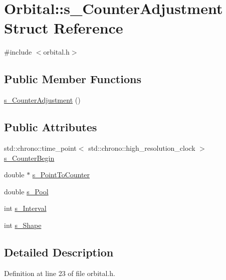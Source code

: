 \hypertarget{struct_orbital_1_1s___counter_adjustment}{}\section{Orbital\+:\+:s\+\_\+\+Counter\+Adjustment Struct Reference}
\label{struct_orbital_1_1s___counter_adjustment}


{\ttfamily \#include $<$orbital.\+h$>$}

\subsection*{Public Member Functions}
\begin{DoxyCompactItemize}
\item 
\hyperlink{struct_orbital_1_1s___counter_adjustment_a6800f68d8b1efa8d3caa0c2ede1833ed}{s\+\_\+\+Counter\+Adjustment} ()
\end{DoxyCompactItemize}
\subsection*{Public Attributes}
\begin{DoxyCompactItemize}
\item 
std\+::chrono\+::time\+\_\+point$<$ std\+::chrono\+::high\+\_\+resolution\+\_\+clock $>$ \hyperlink{struct_orbital_1_1s___counter_adjustment_a111f8b8ad01d41f8f954b99f3a24c668}{s\+\_\+\+Counter\+Begin}
\item 
double $\ast$ \hyperlink{struct_orbital_1_1s___counter_adjustment_aff9f1b4f297f8f569eb706971508caef}{s\+\_\+\+Point\+To\+Counter}
\item 
double \hyperlink{struct_orbital_1_1s___counter_adjustment_ad1ef7d871a1a95a5cc889e44a210ce1a}{s\+\_\+\+Pool}
\item 
int \hyperlink{struct_orbital_1_1s___counter_adjustment_abd239df7e874f967b5bfcc299f26d248}{s\+\_\+\+Interval}
\item 
int \hyperlink{struct_orbital_1_1s___counter_adjustment_a4564ec57f2f73fb6fbccb5dd5b451fd7}{s\+\_\+\+Shape}
\end{DoxyCompactItemize}


\subsection{Detailed Description}


Definition at line 23 of file orbital.\+h.



